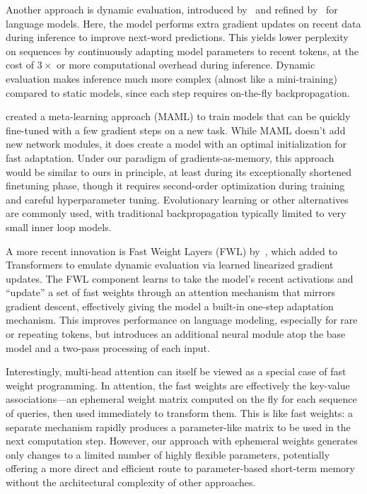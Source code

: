 Another approach is dynamic evaluation, introduced by~\cite{mikolovRecurrentNeuralNetwork2010} and refined by~\cite{pmlr-v80-krause18a} for language models. Here, the model performs extra gradient updates on recent data during inference to improve next-word predictions. This yields lower perplexity on sequences by continuously adapting model parameters to recent tokens, at the cost of $3\times$ or more computational overhead during inference. Dynamic evaluation makes inference much more complex (almost like a mini-training) compared to static models, since each step requires on-the-fly backpropagation.

\cite{finnModelagnosticMetalearningFast2017} created a meta-learning approach (MAML) to train models that can be quickly fine-tuned with a few gradient steps on a new task. While MAML doesn't add new network modules, it does create a model with an optimal initialization for fast adaptation. Under our paradigm of gradients-as-memory, this approach would be similar to ours in principle, at least during its exceptionally shortened finetuning phase, though it requires second-order optimization during training and careful hyperparameter tuning. Evolutionary learning or other alternatives are commonly used, with traditional backpropagation typically limited to very small inner loop models.

A more recent innovation is Fast Weight Layers (FWL) by~\cite{clark-etal-2022-meta}, which added to Transformers to emulate dynamic evaluation via learned linearized gradient updates. The FWL component learns to take the model's recent activations and ``update'' a set of fast weights through an attention mechanism that mirrors gradient descent, effectively giving the model a built-in one-step adaptation mechanism. This improves performance on language modeling, especially for rare or repeating tokens, but introduces an additional neural module atop the base model and a two-pass processing of each input.

Interestingly, multi-head attention can itself be viewed as a special case of fast weight programming. In attention, the fast weights are effectively the key-value associations—an ephemeral weight matrix computed on the fly for each sequence of queries, then used immediately to transform them. This is like fast weights: a separate mechanism rapidly produces a parameter-like matrix to be used in the next computation step. However, our approach with ephemeral weights generates only changes to a limited number of highly flexible parameters, potentially offering a more direct and efficient route to parameter-based short-term memory without the architectural complexity of other approaches.

